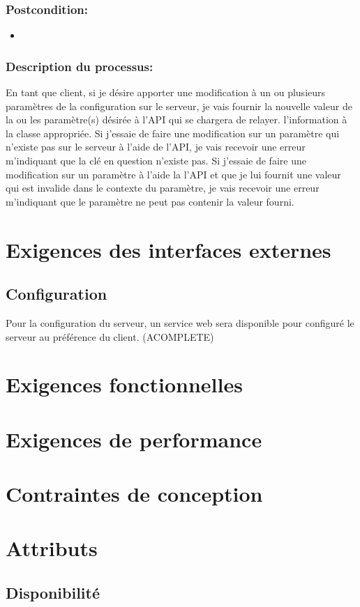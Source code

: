 \documentclass{scrreprt}
\begin{document}
\subsubsection{Postcondition:}
\begin{itemize}
    \item  
\end{itemize} 
\subsubsection{Description du processus:}En tant que client, si je désire apporter une modification à un ou plusieurs
paramètres de la configuration sur le serveur, je vais fournir la nouvelle valeur
de la ou les paramètre(s) désirée à l'API qui se chargera de relayer.
l'information à la classe appropriée.
Si j'essaie de faire une modification sur un paramètre qui n'existe pas sur le
serveur à l'aide de l'API, je vais recevoir une erreur m'indiquant que la clé en
question n'existe pas.
Si j'essaie de faire une modification sur un paramètre à l'aide la l'API et que
je lui fournit une valeur qui est invalide dans le contexte du paramètre, je
vais recevoir une erreur m'indiquant que le paramètre ne peut pas contenir
la valeur fourni.

\section{Exigences des interfaces externes}
\subsection{Configuration}
Pour la configuration du serveur, un service web sera disponible pour configuré le serveur au préférence du client. (ACOMPLETE)
\section{Exigences fonctionnelles}
\section{Exigences de performance}
\section{Contraintes de conception}
\section{Attributs}
\subsection{Disponibilité}
\end{document}
